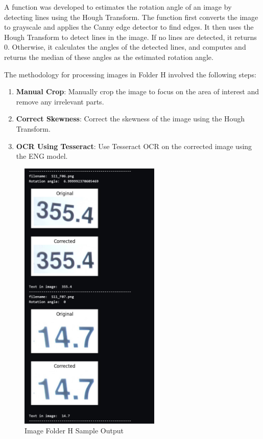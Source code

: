A function was developed to estimates the rotation angle of an image by detecting lines using the Hough Transform. \cite{mukhopadhyaySurveyHoughTransform2015} The function first converts the image to grayscale and applies the Canny edge detector to find edges. It then uses the Hough Transform to detect lines in the image. If no lines are detected, it returns 0. Otherwise, it calculates the angles of the detected lines, and computes and returns the median of these angles as the estimated rotation angle.

The methodology for processing images in Folder H involved the following steps:

\begin{enumerate}
    \item \textbf{Manual Crop}: Manually crop the image to focus on the area of interest and remove any irrelevant parts.
    \item \textbf{Correct Skewness}: Correct the skewness of the image using the Hough Transform.
    \item \textbf{OCR Using Tesseract}: Use Tesseract OCR on the corrected image using the ENG model.

\end{enumerate}

\begin{figure}[ht]
    \centering
    \includegraphics[width=0.6\textwidth]{Figures/Methodology/sipa_11/sample_output.jpg}
    \caption[Image Folder H Sample Output]{Image Folder H Sample Output}
    \label{fig:Image Folder H Sample Output}
\end{figure}


